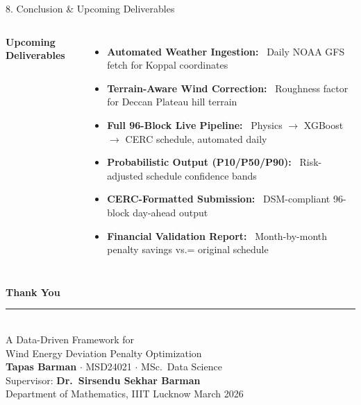 \documentclass[aspectratio=169,10pt]{beamer}
\begin{document}
\begin{frame}{8. \; Conclusion \& Upcoming Deliverables}
\begin{columns}[T]
      \textbf{\small\color{darkblue}Upcoming Deliverables}\\[4pt]
      \begin{itemize}\setlength\itemsep{4pt}\small
        \item \textbf{Automated Weather Ingestion:}
          {\footnotesize\ Daily NOAA GFS fetch for Koppal coordinates}
        \item \textbf{Terrain-Aware Wind Correction:}
          {\footnotesize\ Roughness factor for Deccan Plateau hill terrain}
        \item \textbf{Full 96-Block Live Pipeline:}
          {\footnotesize\ Physics $\rightarrow$ XGBoost $\rightarrow$ CERC schedule, automated daily}
        \item \textbf{Probabilistic Output (P10/P50/P90):}
          {\footnotesize\ Risk-adjusted schedule confidence bands}
        \item \textbf{CERC-Formatted Submission:}
          {\footnotesize\ DSM-compliant 96-block day-ahead output}
        \item \textbf{Financial Validation Report:}
          {\footnotesize\ Month-by-month penalty savings vs.= original schedule}
      \end{itemize}
  \end{columns}
\end{frame}

{
\begin{frame}[plain]
  \centering
  \vspace{1.0cm}
  {\huge\bfseries\color{white}Thank You}\\[0.7cm]
  \rule{0.4\linewidth}{0.4pt}\\[0.5cm]
  {\small\color{white!80}
    A Data-Driven Framework for\\
    Wind Energy Deviation Penalty Optimization}\\[0.5cm]
  {\footnotesize\color{white!65}
    \textbf{Tapas Barman} $\cdot$ MSD24021 $\cdot$ MSc.\ Data Science\\[0.15cm]
    Supervisor: \textbf{Dr.\ Sirsendu Sekhar Barman}\\[0.15cm]
    Department of Mathematics, IIIT Lucknow \quad March 2026}
\end{frame}
}
\end{document}
